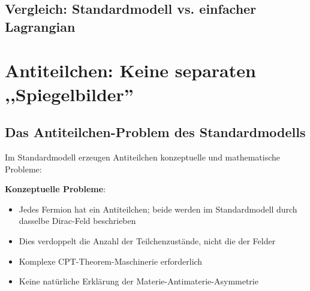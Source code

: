 	\subsection{Vergleich: Standardmodell vs. einfacher Lagrangian}
	
	\begin{table}[htbp]
		\centering
		\caption{Vergleich: Standardmodell-Komplexität vs. einfacher Lagrangian}
		\label{tab:sm_simple_comparison}
	\end{table}
	
	\section{Antiteilchen: Keine separaten ,,Spiegelbilder''}
	
	\subsection{Das Antiteilchen-Problem des Standardmodells}
	
	Im Standardmodell erzeugen Antiteilchen konzeptuelle und mathematische Probleme:
	
	\textbf{Konzeptuelle Probleme}:
	\begin{itemize}
		\item Jedes Fermion hat ein Antiteilchen; beide werden im Standardmodell durch dasselbe Dirac-Feld beschrieben
		\item Dies verdoppelt die Anzahl der Teilchenzustände, nicht die der Felder
		\item Komplexe CPT-Theorem-Maschinerie erforderlich
		\item Keine natürliche Erklärung der Materie-Antimaterie-Asymmetrie
	\end{itemize}
	
